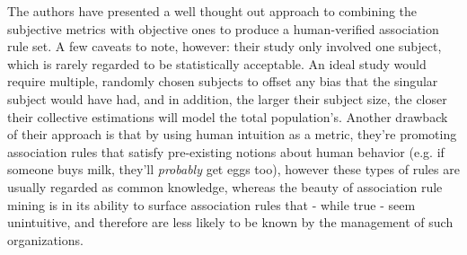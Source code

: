 \documentclass[a4paper,11pt]{article}
\begin{document}
The authors have presented a well thought out approach to combining the subjective metrics with objective ones to produce a human-verified association rule set.  A few caveats to note, however: their study only involved one subject, which is rarely regarded to be statistically acceptable. An ideal study would require multiple, randomly chosen subjects to offset any bias that the singular subject would have had, and in addition, the larger their subject size, the closer their collective estimations will model the total population's.  Another drawback of their approach is that by using human intuition as a metric,  they're promoting association rules that satisfy pre-existing notions about human behavior (e.g. if someone buys milk, they'll \textit{probably} get eggs too), however these types of rules are usually regarded as common knowledge,  whereas the beauty of association rule mining is in its ability to surface association rules that - while true - seem unintuitive, and therefore are less likely to be known by the management of such organizations.
\\\\
\end{document}
